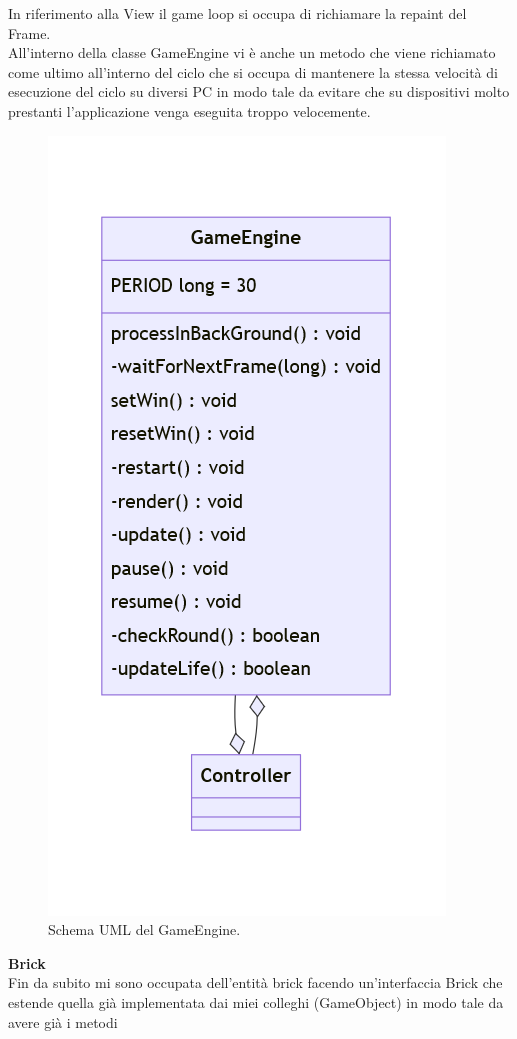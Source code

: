 \documentclass[a4paper,12pt]{report}
\begin{document}
In riferimento alla View il game loop si occupa di richiamare la repaint del Frame.
\\All'interno della classe GameEngine vi è anche un metodo che viene richiamato come ultimo all'interno del ciclo che si occupa di mantenere
la stessa velocità di esecuzione del ciclo su diversi PC in modo tale da evitare che su dispositivi molto prestanti l'applicazione venga eseguita troppo velocemente.
\begin{figure}[H]
    \centering{}
    \includegraphics[scale=0.5]{images/GameEngine.png}
    \caption{Schema UML del GameEngine.}
    \label{images:GameEngine}
\end{figure}
\textbf{Brick}\\
Fin da subito mi sono occupata dell'entità brick facendo un'interfaccia Brick che estende quella già implementata dai miei colleghi (GameObject) in modo tale da avere già i metodi
\end{document}
